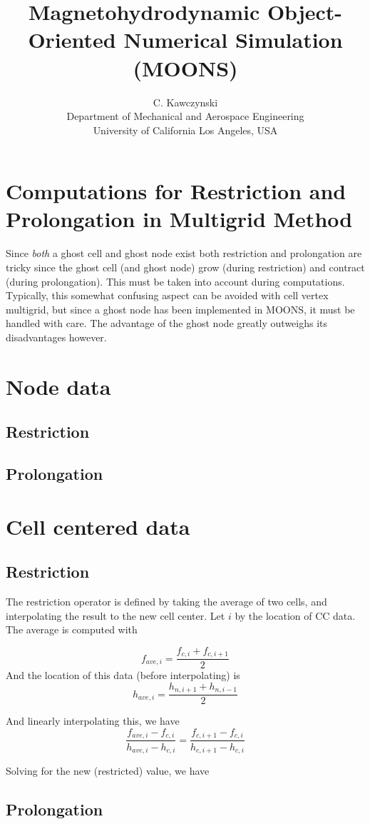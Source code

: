 \documentclass[11pt]{article}
\begin{document}
\doublespacing
\title{Magnetohydrodynamic Object-Oriented Numerical Simulation (MOONS)}
\author{C. Kawczynski \\
Department of Mechanical and Aerospace Engineering \\
University of California Los Angeles, USA\\
}
\maketitle

\section{Computations for Restriction and Prolongation in Multigrid Method}
Since \textit{both} a ghost cell and ghost node exist both restriction and prolongation are tricky since the ghost cell (and ghost node) grow (during restriction) and contract (during prolongation). This must be taken into account during computations. Typically, this somewhat confusing aspect can be avoided with cell vertex multigrid, but since a ghost node has been implemented in MOONS, it must be handled with care. The advantage of the ghost node greatly outweighs its disadvantages however.

\section{Node data}

\subsection{Restriction}
\subsection{Prolongation}

\section{Cell centered data}
\subsection{Restriction}
The restriction operator is defined by taking the average of two cells, and interpolating the result to the new cell center. Let $i$ by the location of CC data. The average is computed with

\begin{equation}
	f_{ave,i} = \frac{f_{c,i}+f_{c,i+1}}{2}
\end{equation}
And the location of this data (before interpolating) is
\begin{equation}
	h_{ave,i} = \frac{h_{n,i+1} + h_{n,i-1}}{2}
\end{equation}

And linearly interpolating this, we have
\begin{equation}
	\frac{f_{ave,i}-f_{c,i}}{h_{ave,i}-h_{c,i}} = \frac{f_{c,i+1}-f_{c,i}}{h_{c,i+1}-h_{c,i}}
\end{equation}

Solving for the new (restricted) value, we have




\subsection{Prolongation}
\end{document}
